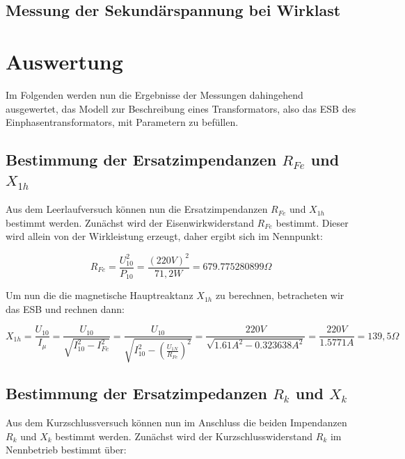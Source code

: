 \documentclass{article}
\begin{document}
\subsection{Messung der Sekundärspannung bei Wirklast}
\label{sec:mess-der-sekund}

\section{Auswertung}
\label{sec:auswertung}

Im Folgenden werden nun die Ergebnisse der Messungen dahingehend ausgewertet, das Modell zur Beschreibung eines Transformators, also das ESB des Einphasentransformators, mit Parametern zu befüllen.


\subsection{Bestimmung der Ersatzimpendanzen $R_{Fe}$ und $X_{1h}$}
\label{sec:best-der-ersatz}

Aus dem Leerlaufversuch können nun die Ersatzimpendanzen $R_{Fe}$ und $X_{1h}$ bestimmt werden. Zunächst wird der Eisenwirkwiderstand $R_{Fe}$ bestimmt. Dieser wird allein von der Wirkleistung erzeugt, daher ergibt sich im Nennpunkt:

\begin{equation*}
  R_{Fe} = \frac{U_{10}^{2}}{P_{10}} = \frac{(220V)^{2}}{71,2W} = 679.775280899\Omega
\end{equation*}

Um nun die die magnetische Hauptreaktanz $X_{1h}$ zu berechnen, betracheten wir das ESB und rechnen dann:

\begin{equation*}
  X_{1h} = \frac{U_{10}}{I_{\mu}} = \frac{U_{10}}{\sqrt{I_{10}^{2}-I_{Fe}^{2}}} = \frac{U_{10}}{\sqrt{I_{10}^{2}-\left(\frac{U_{1N}}{R_{Fe}}\right)^{2}}} = \frac{220V}{\sqrt{1.61A^{2}-0.323638A^{2}}} = \frac{220V}{1.5771A} = 139,5\Omega
\end{equation*}

\subsection{Bestimmung der Ersatzimpedanzen $R_{k}$ und $X_{k}$}
\label{sec:best-der-ersatz-1}

Aus dem Kurzschlussversuch können nun im Anschluss die beiden Impendanzen $R_{k}$ und $X_{k}$ bestimmt werden. Zunächst wird der Kurzschlusswiderstand $R_{k}$ im Nennbetrieb bestimmt über:
\end{document}
